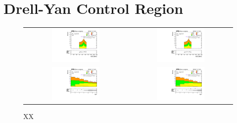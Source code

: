 \section{Drell-Yan Control Region}
\label{sec:DY_CR}

 \begin{figure}[tbh!]
 \begin{center}
 \begin{tabular}{cc}
 \includegraphics[width=0.48\textwidth]{figures/Part4/Evt/llM_OnZ_ee}&
 \includegraphics[width=0.48\textwidth]{figures/Part4/Evt/llM_OnZ_mumu}\\
  \includegraphics[width=0.48\textwidth]{figures/Part4/Evt/njet_OnZ_ee}&
 \includegraphics[width=0.48\textwidth]{figures/Part4/Evt/njet_OnZ_mumu}\\
 \end{tabular}
 \caption{XX}
 \label{fig:DY_CR}
 \end{center}
 \end{figure}